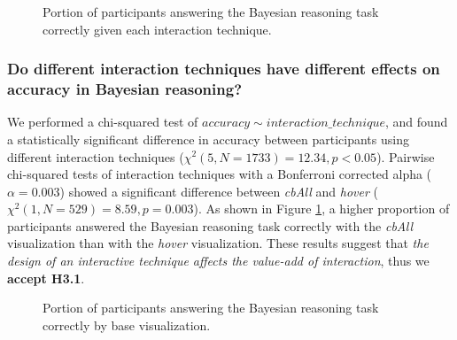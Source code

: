 \begin{figure}[h!]
    \centering
    \caption{Portion of participants answering the Bayesian reasoning task correctly given each interaction technique.} %
    \label{fig:exp2_interactions}
\end{figure}

\subsubsection{Do different interaction techniques have different effects on accuracy in Bayesian reasoning?} 
We performed a chi-squared test of $accuracy \sim interaction\_technique$, and found a statistically significant difference in accuracy between participants using different interaction techniques ($\chi^2(5, N = 1733 ) = 12.34, p < 0.05$). Pairwise chi-squared tests of interaction techniques with a Bonferroni corrected alpha ($\alpha=0.003$) showed a significant difference between \textit{cbAll} and \textit{hover} ($\chi^2(1, N = 529) = 8.59, p = 0.003$). As shown in Figure \ref{fig:exp2_interactions}, a higher proportion of participants answered the Bayesian reasoning task correctly with the \textit{cbAll} visualization than with the \textit{hover} visualization. These results suggest that \textit{the design of an interactive technique affects the value-add of interaction}, thus we \textbf{accept H3.1}. %

\begin{figure}[h!]
    \centering
    \caption{Portion of participants answering the Bayesian reasoning task correctly by base visualization.}
    \label{fig:exp2_bases}
\end{figure}

